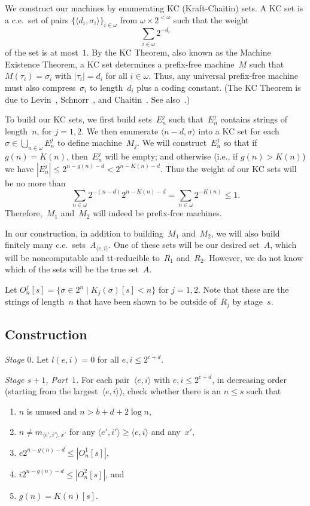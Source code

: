 \documentclass{LMCS}
\newcommand{\0}{\mathbf{0}}
\newcommand{\ce}{c.e.\ }
\newcommand{\KUj}{K_j}
\newcommand{\ei}{{\langle e,i\rangle}}
\newcommand{\eip}{{\langle e',i'\rangle}}
\newcommand{\<}{\langle}
\renewcommand{\>}{\rangle}
\begin{document}
We construct our machines by enumerating KC (Kraft-Chaitin) sets.  A KC set
is a \ce set of pairs $\{\langle d_i, \sigma_i\rangle\}_{i\in\omega}$ from
$\omega \times 2^{<\omega}$ such that the weight
$$
\sum_{i \in \omega} 2^{-d_i}
$$
of the set is at most~$1$.  By the KC Theorem, also known as the Machine
Existence Theorem, a KC set determines a prefix-free machine~$M$ such that
$M(\tau_i)=\sigma_i$ with $|\tau_i|=d_i$ for all $i\in \omega$.  Thus, any
universal prefix-free machine must also compress~$\sigma_i$ to length~$d_i$
plus a coding constant.  (The KC Theorem is due to Levin~\cite{Levin},
Schnorr~\cite{Schnorr}, and Chaitin~\cite{Chaitin}.  See
also~\cite[p.~125]{Downey-Hirschfeldt}.)

To build our KC sets, we first build sets~$E^j_n$ such that~$E^j_n$ contains
strings of length~$n$, for $j=1,2$. We then enumerate $\langle n-d, \sigma
\rangle$ into a KC set for each $\sigma\in \bigcup_{n\in\omega}E^j_n$ to
define machine~$M_j$. We will construct~$E^j_n$ so that if $g(n)=K(n)$,
then~$E_n^j$ will be empty; and otherwise (i.e., if $g(n)>K(n)$) we have
$|E^j_n|\leq 2^{n-g(n)-d}< 2^{n-K(n)-d}$. Thus the weight of our KC sets will
be no more than
$$
\sum_{n\in\omega} 2^{-(n-d)}2^{n-K(n)-d}=\sum_{n\in\omega} 2^{-K(n)}\leq1.
$$
Therefore,~$M_1$ and~$M_2$ will indeed be prefix-free machines.

In our construction, in addition to building~$M_1$ and~$M_2$, we will also
build finitely many \ce sets~$A_\ei$.  One of these sets will be our desired
set~$A$, which will be noncomputable and tt-reducible to~$R_1$ and~$R_2$.
However, we do not know which of the sets will be the true set~$A$.


Let $O^j_n[s]=\{\sigma \in 2^n \mid \KUj(\sigma)[s]<n\}$ for $j=1, 2$.  Note
that these are the strings of length~$n$ that have been shown to be outside
of~$R_j$ by stage~$s$.


\subsection{Construction}



{\em Stage $0$}.  Let $l(e,i)=0$ for all $e,i\leq 2^{c+d}$.


\medskip
{\em Stage $s+1$, Part~$1$.} For each pair~$\ei$ with $e,i\leq 2^{c+d}$, in
decreasing order (starting from the largest~$\ei$), check whether there is an
$n\leq s$ such that
\begin{enumerate}[label=(\roman*)]
\item $n$ is unused and $n>b+d+2\log n$,
\item $n\neq m_{{\eip},x'}$ for any $\eip\geq \ei$ and any~$x'$,
\item $e2^{n-g(n)-d}\leq|O^1_n[s]|$,
\item $i2^{n-g(n)-d}\leq |O^2_n[s]|$, and
\item $g(n)= K(n)[s]$.
\end{enumerate}
\end{document}
